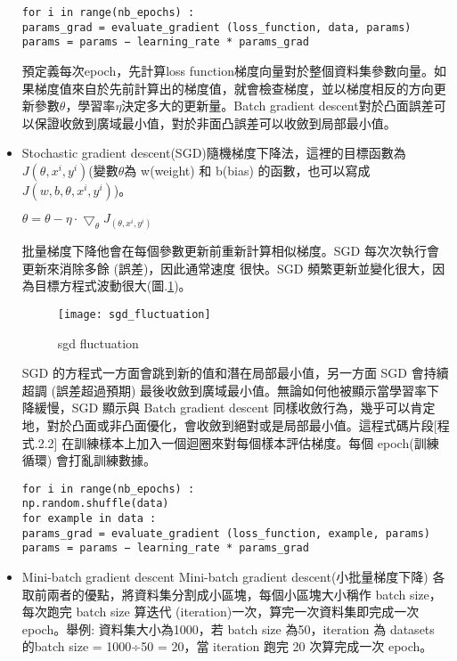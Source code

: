 \begin{itemize}
\begin{lstlisting}[caption=\Large Batch gradient descrnt]
 for i in range(nb_epochs) :
params_grad = evaluate_gradient (loss_function, data, params)
params = params − learning_rate * params_grad
\end{lstlisting}
\newpage
 預定義每次epoch，先計算loss function梯度向量對於整個資料集參數向量。如果梯度值來自於先前計算出的梯度值，就會檢查梯度，並以梯度相反的方向更新參數$\theta$，學習率$\eta$決定多大的更新量。Batch gradient descent對於凸面誤差可以保證收斂到廣域最小值，對於非面凸誤差可以收斂到局部最小值。
\item Stochastic gradient descent(SGD)隨機梯度下降法，這裡的目標函數為$J(\theta, x^i, y^i)$(變數$\theta$為 w(weight) 和 b(bias) 的函數，也可以寫成$J(w,b,\theta, x^i, y^i)$)。\\
\begin{center}
$\theta=\theta-\eta\cdot\bigtriangledown_{\theta}J_{(\theta, x^i, y^i)}$
\end{center}
批量梯度下降他會在每個參數更新前重新計算相似梯度。SGD 每次次執行會更新來消除多餘 (誤差)，因此通常速度 很快。SGD 頻繁更新並變化很大，因為目標方程式波動很大(圖.\ref{sgd_fluctuation})。\\
\newpage
\begin{figure}
\begin{center}
\texttt{[image: sgd\_fluctuation]}
\caption{\Large sgd fluctuation}
\label{sgd_fluctuation}
\end{center}
\end{figure}
 SGD 的方程式一方面會跳到新的值和潛在局部最小值，另一方面 SGD 會持續超調 (誤差超過預期) 最後收斂到廣域最小值。無論如何他被顯示當學習率下降緩慢，SGD 顯示與 Batch gradient descent 同樣收斂行為，幾乎可以肯定地，對於凸面或非凸面優化，會收斂到絕對或是局部最小值。這程式碼片段[程式.2.2] 在訓練樣本上加入一個迴圈來對每個樣本評估梯度。每個 epoch(訓練循環) 會打亂訓練數據。
\label{code Stochastic gradient descrnt code}
\begin{lstlisting}[caption=\Large Stochastic gradient descrnt ]
for i in range(nb_epochs) :
np.random.shuffle(data)
for example in data :
params_grad = evaluate_gradient (loss_function, example, params)
params = params − learning_rate * params_grad
\end{lstlisting}
\item Mini-batch gradient descent
 Mini-batch gradient descent(小批量梯度下降) 各取前兩者的優點，將資料集分割成小區塊，每個小區塊大小稱作 batch size，每次跑完 batch size 算迭代 (iteration)一次，算完一次資料集即完成一次 epoch。舉例: 資料集大小為1000，若 batch size 為50，iteration 為 datasets 的batch size  = 1000÷50 = 20，當 iteration 跑完 20 次算完成一次 epoch。\\

\end{itemize}
